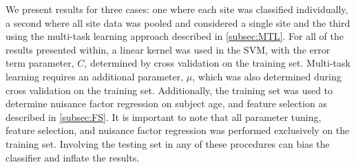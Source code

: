 \documentclass{llncs}
\begin{document}
We present results for three cases: one where each site was classified individually, a second where all site data was pooled and considered a single site and the third using the multi-task learning approach described in \ref{subsec:MTL}. For all of the results presented within, a linear kernel was used in the SVM, with the error term parameter, $C$,  determined by cross validation on the training set. Multi-task learning requires an additional parameter, $\mu$, which was also determined during cross validation on the training set. Additionally, the training set was used to determine nuisance factor regression on subject age, and feature selection as described in \ref{subsec:FS}. It is important to note that all parameter tuning, feature selection, and nuisance factor regression was performed exclusively on the training set. Involving the testing set in any of these procedures can bias the classifier and inflate the results. 

\end{document}

